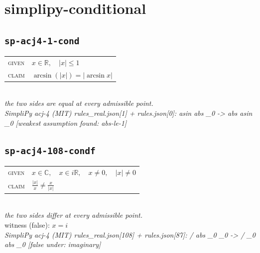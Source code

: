 \documentclass[11pt]{article}
\begin{document}
\section*{simplipy-conditional}
\subsection*{\texttt{sp-acj4-1-cond}}
\begin{tabular}{@{}l@{\quad}l@{}}
\textsc{given} & $x \in \mathbb{R},\quad \left|x\right| \le 1$ \\[4pt]
\textsc{claim} & $\displaystyle \arcsin\left(\left|x\right|\right) = \left|\arcsin x\right|$ \\
\end{tabular}\\[2pt]
{\small\emph{the two sides are equal at every admissible point.}}\\
\emph{SimpliPy acj-4 (MIT) rules\_real.json[1] + rules.json[0]: asin abs \_0  ->  abs asin \_0  [weakest assumption found: abs-le-1]}\\

\subsection*{\texttt{sp-acj4-108-condf}}
\begin{tabular}{@{}l@{\quad}l@{}}
\textsc{given} & $x \in \mathbb{C},\quad x \in i\mathbb{R},\quad x \neq 0,\quad \left|x\right| \neq 0$ \\[4pt]
\textsc{claim} & $\displaystyle \frac{\left|x\right|}{x} \neq \frac{x}{\left|x\right|}$ \\
\end{tabular}\\[2pt]
{\small\emph{the two sides differ at every admissible point.}}\\
{\footnotesize\color{gray}witness (false): $x = i$}\\
\emph{SimpliPy acj-4 (MIT) rules\_real.json[108] + rules.json[87]: / abs \_0 \_0  ->  / \_0 abs \_0  [false under: imaginary]}\\
\end{document}
